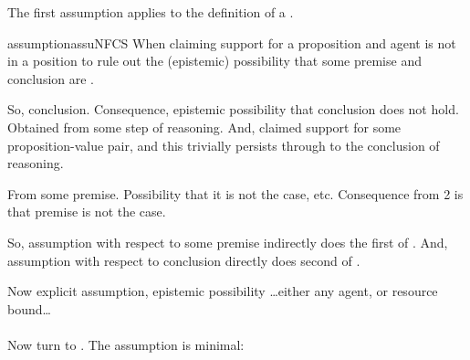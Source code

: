 \begin{note}
  The first assumption applies \ideaCSA{} to the definition of a \requ{}.

  \begin{restatable}[\nfcs{--} -- \nfcs{}]{assumption}{assuNFCS}\label{assu:supp:nfactive}
    When claiming support for a proposition and agent is not in a position to rule out the (epistemic) possibility that some premise and conclusion are .
  \end{restatable}

  So, conclusion.
  Consequence, epistemic possibility that conclusion does not hold.
  Obtained from some step of reasoning.
  And, claimed support for some proposition-value pair, and this trivially persists through to the conclusion of reasoning.

  From some premise.
  Possibility that it is not the case, etc.
  Consequence from 2 is that premise is not the case.

  So, assumption with respect to some premise indirectly does the first of \ideaCSA{}.
  And, assumption with respect to conclusion directly does second of \ideaCSA{}.
\end{note}

\begin{note}
  Now explicit assumption, epistemic possibility \dots either any agent, or resource bound\dots
\end{note}

\paragraph{\ideaCSB{}}

\begin{note}
  Now turn to \ideaCSB{}.
  The assumption is minimal:
\end{note}

